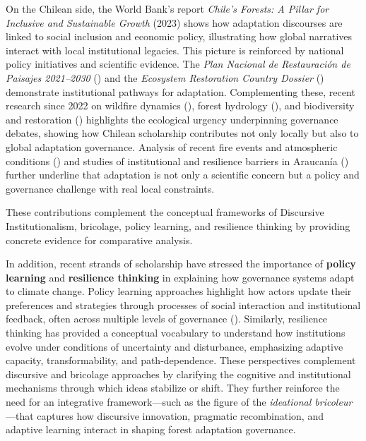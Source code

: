 On the Chilean side, the World Bank’s report \textit{Chile’s Forests: A Pillar 
for Inclusive and Sustainable Growth} (2023) shows how adaptation discourses
are linked to social inclusion and economic policy, illustrating how global 
narratives interact with local institutional legacies. This picture is reinforced 
by national policy initiatives and scientific evidence. 
The \textit{Plan Nacional de 
Restauración de Paisajes 2021--2030} (\cite{MMA2021}) and the 
\textit{Ecosystem Restoration Country Dossier} 
(\cite{MMACONAF2024}) demonstrate 
institutional pathways for adaptation. Complementing these, recent research since 2022 on 
wildfire dynamics (\cite{VidalSilva2025}), forest hydrology (\cite{Balocchi2023}), and 
biodiversity and restoration (\cite{Bosque2022Biodiversity,RCHN2023Restoration}) highlights 
the ecological urgency underpinning governance debates, showing how Chilean scholarship 
contributes not only locally but also to global adaptation governance. 
Analysis of recent fire events and atmospheric conditions (\cite{McWethy2021FiresChile}) 
and studies of institutional and resilience barriers in Araucanía (\cite{Banwell2020AraucaniaResilience}) 
further underline that adaptation is not only a scientific concern but a policy and 
governance challenge with real local constraints.

These contributions complement the conceptual frameworks of Discursive Institutionalism, 
bricolage, policy learning, and resilience thinking by providing concrete evidence for 
comparative analysis.

In addition, recent strands of scholarship have stressed the importance of 
\textbf{policy learning} and \textbf{resilience thinking} in explaining how 
governance systems adapt to climate change. Policy learning approaches highlight 
how actors update their preferences and strategies through processes of social 
interaction and institutional feedback, often across multiple levels of governance 
(\cite{DuitGalaz2020,JordanHuitema2019}). Similarly, resilience thinking has 
provided a conceptual vocabulary to understand how institutions evolve under 
conditions of uncertainty and disturbance, emphasizing adaptive capacity, 
transformability, and path-dependence. These perspectives complement discursive 
and bricolage approaches by clarifying the cognitive and institutional mechanisms 
through which ideas stabilize or shift. They further reinforce the need for an 
integrative framework---such as the figure of the \textit{ideational bricoleur}---that 
captures how discursive innovation, pragmatic recombination, and adaptive learning 
interact in shaping forest adaptation governance.

